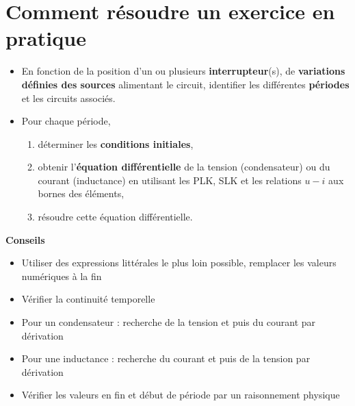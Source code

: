 \section{Comment résoudre un exercice en pratique}
\begin{itemize}
	\item En fonction de la position d'un ou plusieurs \textbf{interrupteur}(s), de {\bf variations définies des sources} alimentant le circuit, identifier les différentes \textbf{périodes} et les circuits associés.
	\item Pour chaque période,
	\begin{enumerate}
		\item déterminer les \textbf{conditions initiales},
		\item obtenir l'\textbf{équation différentielle} de la tension (condensateur) ou du courant (inductance) en utilisant les PLK, SLK et les relations $u-i$ aux bornes des éléments,
		\item résoudre cette équation différentielle.
	\end{enumerate}
\end{itemize}
\textbf{{Conseils}}
\begin{itemize}
	\item Utiliser des expressions littérales le plus loin possible, remplacer les valeurs numériques à la fin
	\item Vérifier la continuité temporelle
	\item Pour un condensateur : recherche de la tension et puis du courant par dérivation
	\item Pour une inductance : recherche du courant et puis de la tension par dérivation
	\item Vérifier les valeurs en fin et début de période par un raisonnement physique
\end{itemize}

